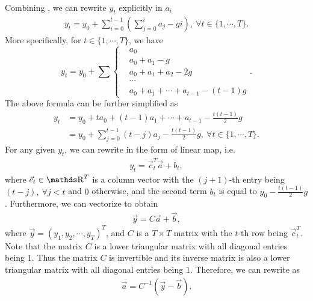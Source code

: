 \documentclass[letterpaper,10pt]{article}
\begin{document}
Combining , we can rewrite $y_t$ explicitly in $a_i$
\begin{align}
    \label{eq:yt-rewrite}
    y_t = y_0 + \sum_{i=0}^{t-1} \left(\sum_{j=0}^{i} a_j - g i\right),~\forall t\in \{1,\cdots,T\}.
\end{align}
More specifically, for $t\in \{1,\cdots,T\}$, we have
\begin{equation}
    y_t=y_0+\sum
    \left\{
        \begin{array}{lllll}
            & a_0\\
            & a_0+a_1-g\\
            & a_0+a_1+a_2-2g\\
            & \cdots\\
            & a_0+a_1+\cdots+a_{t-1}-(t-1)g
        \end{array}
    \right..
\end{equation}
The above formula can be further simplified as
\begin{align}
    y_t &= y_0 + t a_0 + (t-1)a_1 + \cdots + a_{t-1} - \frac{t(t-1)}{2} g\\
    \label{eq:yt-rewrite2}
    &= y_0 + \sum_{j=0}^{t-1} (t-j) a_j - \frac{t(t-1)}{2} g,~\forall t\in \{1,\cdots,T\}.
\end{align}
For any given $y_t$, we can rewrite  in the form of linear map, i.e.
\begin{align}
    \label{eq:yt-liear-combine}
    y_t = \vec c_t^T \vec a + b_t,
\end{align}
where $\vec c_t\in \Reals^T$ is a column vector with the $(j+1)$-th entry being $(t-j),~\forall j<t$ and $0$ otherwise, and the second term $b_t$ is equal to $y_0-\frac{t(t-1)}{2} g$.
Furthermore, we can vectorize  to obtain
\begin{align}
    \label{eq:yt-liear-map}
    \vec y = C \vec a + \vec b,
\end{align}
where $\vec y=(y_1,y_2,\cdots,y_T)^T$, and $C$ is a $T\times T$ matrix with the $t$-th row being $\vec c_t^T$.
Note that the matrix $C$ is a lower triangular matrix with all diagonal entries being $1$.
Thus the matrix $C$ is invertible and its inverse matrix is also a lower triangular matrix with all diagonal entries being $1$.
Therefore, we can rewrite  as
\begin{align}
    \label{eq:yt-liear-map2}
    \vec a = C^{-1} (\vec y - \vec b).
\end{align}
\end{document}
